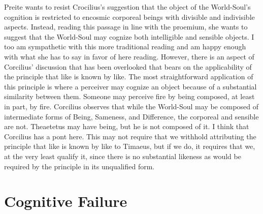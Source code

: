 \documentclass[12pt]{article}
\begin{document}
Preite wants to resist Crocilius's suggestion that the object of the World-Soul's cognition is restricted to encosmic corporeal beings with divisible and indivisible aspects. Instead, reading this passage in line with the proemium, she wants to suggest that the World-Soul may cognize both intelligible and sensible objects. I too am sympathetic with this more traditional reading and am happy enough with what she has to say in favor of here reading. However, there is an aspect of Corcilius' discussion that has been overlooked that bears on the applicability of the principle that like is known by like. The most straightforward application of this principle is where a perceiver may cognize an object because of a substantial similarity between them. Someone may perceive fire by being composed, at least in part, by fire. Corcilius observes that while the World-Soul may be composed of intermediate forms of Being, Sameness, and Difference, the corporeal and sensible are not. Theaetetus may have being, but he is not composed of it. I think that Corcilius has a pont here. This may not require that we withhold attributing the principle that like is known by like to Timaeus, but if we do, it requires that we, at the very least qualify it, since there is no substantial likeness as would be required by the principle in its unqualified form. 


\section{Cognitive Failure} %
\label{sec:cogntive_failure}
\end{document}
